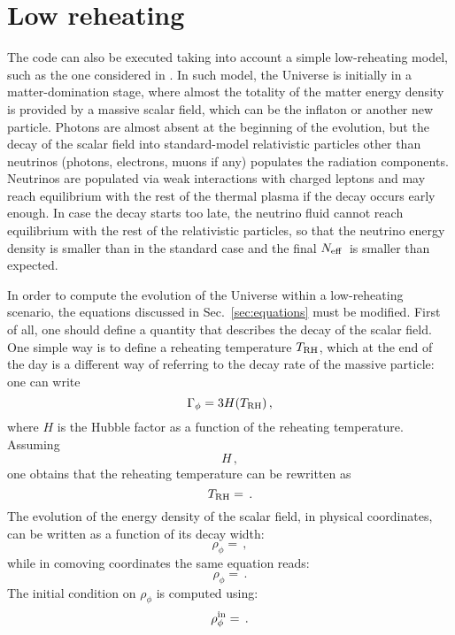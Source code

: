 \documentclass[notitlepage,showpacs,preprintnumbers,amsmath,amssymb,superscriptaddress,prd,onecolumn]{revtex4-1}
\newcommand{\Neff}{\ensuremath{N_{\rm eff}}}
\begin{document}
\section{Low reheating}
\label{sec:lowreheating}
The code can also be executed taking into account a simple low-reheating model,
such as the one considered in \cite{deSalas:2015glj,low_reheating2020}.
In such model, the Universe is initially in a matter-domination stage,
where almost the totality of the matter energy density is provided by a massive scalar field,
which can be the inflaton or another new particle.
Photons are almost absent at the beginning of the evolution,
but the decay of the scalar field into standard-model relativistic particles other than neutrinos
(photons, electrons, muons if any)
populates the radiation components.
Neutrinos are populated via weak interactions with charged leptons and may reach equilibrium
with the rest of the thermal plasma if the decay occurs early enough.
In case the decay starts too late, the neutrino fluid cannot reach equilibrium
with the rest of the relativistic particles,
so that the neutrino energy density is smaller than in the standard case
and the final \Neff\ is smaller than expected.

In order to compute the evolution of the Universe within a low-reheating scenario,
the equations discussed in Sec.~\ref{sec:equations} must be modified.
First of all, one should define a quantity that describes the decay of the scalar field.
One simple way is to define a reheating temperature $T_{\rm RH}$,
which at the end of the day is a different way of referring to the decay rate of the massive particle:
one can write
\begin{equation}
\label{eq:gamma_phi}
\Gamma_\phi
=
3H(T_{\rm RH})\,,
\end{equation}
where $H$ is the Hubble factor as a function of the reheating temperature.
Assuming
\begin{equation}
\label{eq:H_lr}
H
\,,
\end{equation}
one obtains that the reheating temperature can be rewritten as
\begin{equation}
\label{eq:Trh_gammaphi}
T_{\rm RH}
=
\,.
\end{equation}
The evolution of the energy density of the scalar field, in physical coordinates,
can be written as a function of its decay width:
\begin{equation}
\label{eq:rho_phi_physical}
\rho_\phi
=
\,,
\end{equation}
while in comoving coordinates the same equation reads:
\begin{equation}
\label{eq:rho_phi_comoving}
\rho_\phi
=
\,.
\end{equation}
The initial condition on $\rho_\phi$ is computed using:
\begin{equation}
\label{eq:rho_phi_initial}
\rho_\phi^{\rm in}
=
\,.
\end{equation}
\end{document}
